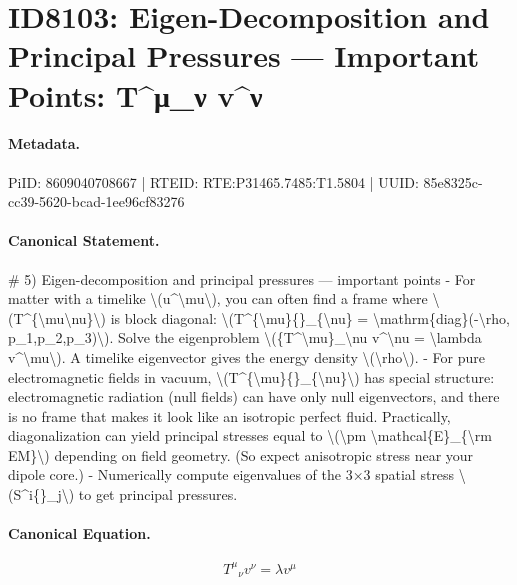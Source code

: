 \section*{ID8103: Eigen-Decomposition and Principal Pressures — Important Points: T\textasciicircum{}μ\_ν v\textasciicircum{}ν}
\paragraph{Metadata.}
PiID: 8609040708667 | RTEID: RTE:P31465.7485:T1.5804 | UUID: 85e8325c-cc39-5620-bcad-1ee96cf83276

\paragraph{Canonical Statement.}
\# 5) Eigen-decomposition and principal pressures — important points - For matter with a timelike \textbackslash{}(u\textasciicircum{}\textbackslash{}mu\textbackslash{}), you can often find a frame where \textbackslash{}(T\textasciicircum{}\{\textbackslash{}mu\textbackslash{}nu\}\textbackslash{}) is block diagonal: \textbackslash{}(T\textasciicircum{}\{\textbackslash{}mu\}\{\}\_\{\textbackslash{}nu\} = \textbackslash{}mathrm\{diag\}(-\textbackslash{}rho, p\_1,p\_2,p\_3)\textbackslash{}). Solve the eigenproblem \textbackslash{}(\{T\textasciicircum{}\textbackslash{}mu\}\_\textbackslash{}nu v\textasciicircum{}\textbackslash{}nu = \textbackslash{}lambda v\textasciicircum{}\textbackslash{}mu\textbackslash{}). A timelike eigenvector gives the energy density \textbackslash{}(\textbackslash{}rho\textbackslash{}). - For pure electromagnetic fields in vacuum, \textbackslash{}(T\textasciicircum{}\{\textbackslash{}mu\}\{\}\_\{\textbackslash{}nu\}\textbackslash{}) has special structure: electromagnetic radiation (null fields) can have only null eigenvectors, and there is no frame that makes it look like an isotropic perfect fluid. Practically, diagonalization can yield principal stresses equal to \textbackslash{}(\textbackslash{}pm \textbackslash{}mathcal\{E\}\_\{\textbackslash{}rm EM\}\textbackslash{}) depending on field geometry. (So expect anisotropic stress near your dipole core.) - Numerically compute eigenvalues of the 3×3 spatial stress \textbackslash{}(S\textasciicircum{}i\{\}\_j\textbackslash{}) to get principal pressures.

\paragraph{Canonical Equation.}
\[
{T^\mu}_\nu v^\nu = \lambda v^\mu
\]

